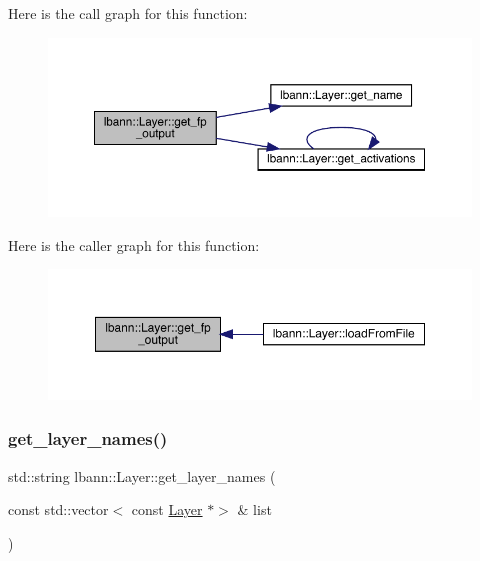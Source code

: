 Here is the call graph for this function\+:\nopagebreak
\begin{figure}[H]
\begin{center}
\leavevmode
\includegraphics[width=350pt]{classlbann_1_1Layer_ac6b43c63399f717cc1a4a0a2007350f2_cgraph}
\end{center}
\end{figure}
Here is the caller graph for this function\+:\nopagebreak
\begin{figure}[H]
\begin{center}
\leavevmode
\includegraphics[width=350pt]{classlbann_1_1Layer_ac6b43c63399f717cc1a4a0a2007350f2_icgraph}
\end{center}
\end{figure}
\mbox{\label{classlbann_1_1Layer_af4a093d91552cf079217eb346bbb847f}} 
\subsubsection{\texorpdfstring{get\+\_\+layer\+\_\+names()}{get\_layer\_names()}}
{\footnotesize\ttfamily std\+::string lbann\+::\+Layer\+::get\+\_\+layer\+\_\+names (\begin{DoxyParamCaption}\item[{const std\+::vector$<$ const \hyperlink{classlbann_1_1Layer}{Layer} $\ast$$>$ \&}]{list }\end{DoxyParamCaption})\hspace{0.3cm}{\ttfamily [static]}}

